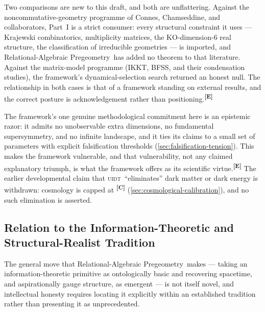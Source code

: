 \documentclass[12pt,a4paper,twoside]{article}
\theoremstyle{plain}
\theoremstyle{definition}
\theoremstyle{remark}
\newcommand{\ProjectShort}{Relational-Algebraic Pregeometry}
\newcommand{\RAP}{\ProjectShort}
\newcommand{\UIDT}{\textsc{uidt}} %
\newcommand{\catmark}[1]{\textsuperscript{\textsf{\textbf{[#1]}}}}
\begin{document}
Two comparisons are new to this draft, and both are unflattering. Against
the noncommutative-geometry programme of Connes, Chamseddine, and
collaborators, Part~I is a strict consumer: every structural constraint
it uses --- Krajewski combinatorics, multiplicity matrices, the
KO-dimension-6 real structure, the classification of irreducible
geometries --- is imported, and \RAP\ has added no theorem to that
literature. Against the matrix-model programme (IKKT, BFSS, and their
condensation studies), the framework's dynamical-selection search
returned an honest null. The relationship in both cases is that of a
framework standing on external results, and the correct posture is
acknowledgement rather than positioning.\catmark{E}

The framework's one genuine methodological commitment here is an
epistemic razor: it admits no unobservable extra dimensions, no
fundamental supersymmetry, and no infinite landscape, and it ties its
claims to a small set of parameters with explicit falsification
thresholds (\cref{sec:falsification-tension}). This makes the framework
vulnerable, and that vulnerability, not any claimed explanatory triumph,
is what the framework offers as its scientific virtue.\catmark{E} The
earlier developmental claim that \UIDT\ ``eliminates'' dark matter or
dark energy is withdrawn: cosmology is capped at \catmark{C}
(\cref{sec:cosmological-calibration}), and no such elimination is
asserted.

\subsection{Relation to the Information-Theoretic and Structural-Realist Tradition}
\label{subsec:prior-art}

The general move that \RAP\ makes --- taking an information-theoretic
primitive as ontologically basic and recovering spacetime, and
aspirationally gauge structure, as emergent --- is not itself novel, and
intellectual honesty requires locating it explicitly within an
established tradition rather than presenting it as unprecedented.
\end{document}
